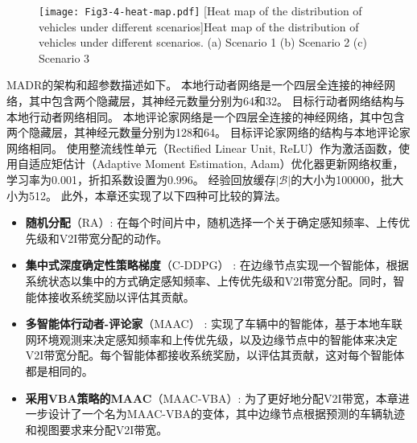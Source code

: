 \begin{figure}[h]
\centering
  \texttt{[image: Fig3-4-heat-map.pdf]}
  [Heat map of the distribution of vehicles under different scenarios]{Heat map of the distribution of vehicles under different scenarios. (a) Scenario 1 (b) Scenario 2 (c) Scenario 3}
  \label{fig 3-4}
\end{figure} 

MADR的架构和超参数描述如下。
本地行动者网络是一个四层全连接的神经网络，其中包含两个隐藏层，其神经元数量分别为64和32。
目标行动者网络结构与本地行动者网络相同。
本地评论家网络是一个四层全连接的神经网络，其中包含两个隐藏层，其神经元数量分别为128和64。
目标评论家网络的结构与本地评论家网络相同。
使用整流线性单元（Rectified Linear Unit, ReLU）作为激活函数，使用自适应矩估计（Adaptive Moment Estimation, Adam）优化器更新网络权重，学习率为0.001，折扣系数设置为0.996。
经验回放缓存$|\mathcal{B}|$的大小为100000，批大小为512。
此外，本章还实现了以下四种可比较的算法。

\begin{itemize}
	\item \textbf{随机分配}（RA）: 在每个时间片中，随机选择一个关于确定感知频率、上传优先级和V2I带宽分配的动作。
	\item \textbf{集中式深度确定性策略梯度}（C-DDPG） \cite{mlika2022deep}: 在边缘节点实现一个智能体，根据系统状态以集中的方式确定感知频率、上传优先级和V2I带宽分配。同时，智能体接收系统奖励以评估其贡献。
	\item \textbf{多智能体行动者-评论家}（MAAC） \cite{he2021efficient}: 实现了车辆中的智能体，基于本地车联网环境观测来决定感知频率和上传优先级，以及边缘节点中的智能体来决定V2I带宽分配。每个智能体都接收系统奖励，以评估其贡献，这对每个智能体都是相同的。
	\item \textbf{采用VBA策略的MAAC}（MAAC-VBA）: 为了更好地分配V2I带宽，本章进一步设计了一个名为MAAC-VBA的变体，其中边缘节点根据预测的车辆轨迹和视图要求来分配V2I带宽。
\end{itemize}

